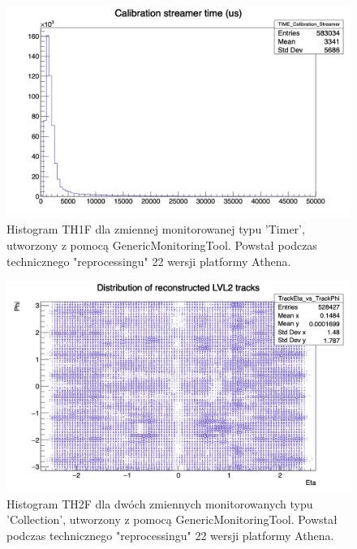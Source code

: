 \begin{figure}[!ht]
\centering
\includegraphics[width=1\textwidth]{img/histogram_TH1_time.png}
\caption{
Histogram TH1F dla zmiennej monitorowanej typu 'Timer', utworzony z pomocą GenericMonitoringTool. Powstał podczas technicznego "reprocessingu" 22 wersji platformy Athena.
}
\label{fig:athena:histogram_TH1_time}
\end{figure}

\begin{figure}[!ht]
\centering
\includegraphics[width=1\textwidth]{img/histogram_TH2.png}
\caption{
Histogram TH2F dla dwóch zmiennych monitorowanych typu 'Collection', utworzony z pomocą GenericMonitoringTool. Powstał podczas technicznego "reprocessingu" 22 wersji platformy Athena.
}
\label{fig:athena:histogram_TH2}
\end{figure}

\FloatBarrier

